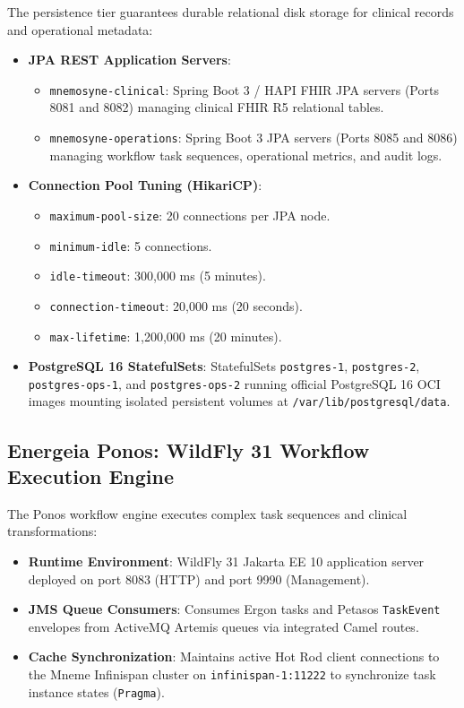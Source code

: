 The persistence tier guarantees durable relational disk storage for clinical records and operational metadata:
\begin{itemize}
    \item \textbf{JPA REST Application Servers}:
    \begin{itemize}
        \item \texttt{mnemosyne-clinical}: Spring Boot 3 / HAPI FHIR JPA servers (Ports 8081 and 8082) managing clinical FHIR R5 relational tables.
        \item \texttt{mnemosyne-operations}: Spring Boot 3 JPA servers (Ports 8085 and 8086) managing workflow task sequences, operational metrics, and audit logs.
    \end{itemize}
    \item \textbf{Connection Pool Tuning (HikariCP)}:
    \begin{itemize}
        \item \texttt{maximum-pool-size}: 20 connections per JPA node.
        \item \texttt{minimum-idle}: 5 connections.
        \item \texttt{idle-timeout}: 300,000 ms (5 minutes).
        \item \texttt{connection-timeout}: 20,000 ms (20 seconds).
        \item \texttt{max-lifetime}: 1,200,000 ms (20 minutes).
    \end{itemize}
    \item \textbf{PostgreSQL 16 StatefulSets}: StatefulSets \texttt{postgres-1}, \texttt{postgres-2}, \texttt{postgres-ops-1}, and \texttt{postgres-ops-2} running official PostgreSQL 16 OCI images mounting isolated persistent volumes at \texttt{/var/lib/postgresql/data}.
\end{itemize}

\subsection{Energeia Ponos: WildFly 31 Workflow Execution Engine}

The Ponos workflow engine executes complex task sequences and clinical transformations:
\begin{itemize}
    \item \textbf{Runtime Environment}: WildFly 31 Jakarta EE 10 application server deployed on port 8083 (HTTP) and port 9990 (Management).
    \item \textbf{JMS Queue Consumers}: Consumes Ergon tasks and Petasos \texttt{TaskEvent} envelopes from ActiveMQ Artemis queues via integrated Camel routes.
    \item \textbf{Cache Synchronization}: Maintains active Hot Rod client connections to the Mneme Infinispan cluster on \texttt{infinispan-1:11222} to synchronize task instance states (\texttt{Pragma}).
\end{itemize}

